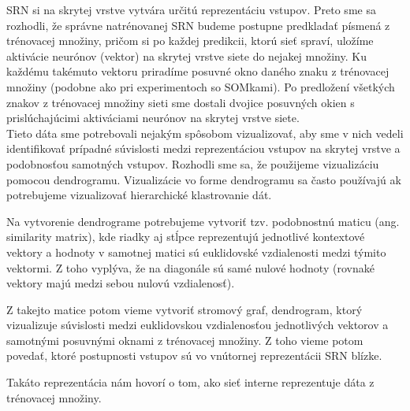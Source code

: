 SRN si na skrytej vrstve vytvára určitú reprezentáciu vstupov. Preto sme sa rozhodli, že 
správne natrénovanej SRN budeme postupne predkladať písmená z trénovacej množiny, pričom si po každej predikcii, ktorú sieť spraví,
 uložíme aktivácie neurónov (vektor) na skrytej vrstve siete do nejakej množiny. 
Ku každému takémuto vektoru priradíme posuvné okno daného znaku z trénovacej množiny (podobne ako pri experimentoch so SOMkami). 
Po predložení všetkých znakov z trénovacej množiny sieti sme dostali dvojice posuvných okien s prislúchajúcimi aktiváciami neurónov
na skrytej vrstve siete. \\

Tieto dáta sme potrebovali nejakým spôsobom vizualizovať, aby sme v nich vedeli identifikovať prípadné súvislosti medzi reprezentáciou vstupov na skrytej vrstve a 
podobnosťou samotných vstupov.
Rozhodli sme sa, že použijeme vizualizáciu pomocou dendrogramu.
Vizualizácie vo forme dendrogramu sa často používajú ak potrebujeme vizualizovať hierarchické klastrovanie dát.

Na vytvorenie dendrograme potrebujeme vytvoriť tzv. podobnostnú maticu (ang. similarity matrix), kde 
riadky aj stĺpce reprezentujú jednotlivé kontextové vektory a hodnoty v samotnej matici sú euklidovské vzdialenosti medzi týmito vektormi.
Z toho vyplýva, že na diagonále sú samé nulové hodnoty (rovnaké vektory majú medzi sebou nulovú vzdialenosť).

Z takejto matice potom vieme vytvoriť stromový graf, dendrogram, ktorý vizualizuje súvislosti medzi euklidovskou vzdialenosťou jednotlivých vektorov a samotnými posuvnými oknami z trénovacej množiny.
Z toho vieme potom povedať, ktoré postupnosti vstupov sú vo vnútornej reprezentácii SRN blízke. 

Takáto reprezentácia nám hovorí o tom, ako sieť interne reprezentuje dáta z trénovacej množiny.


